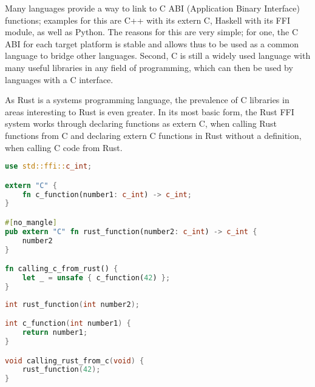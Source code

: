 Many languages provide a way to link to C ABI (Application Binary Interface) functions; examples for this are C++ with its extern C, Haskell with its FFI module, as well as Python.
The reasons for this are very simple; for one, the C ABI for each target platform is stable and allows thus to be used as a common language to bridge other languages.
Second, C is still a widely used language with many useful libraries in any field of programming, which can then be used by languages with a C interface.

As Rust is a systems programming language, the prevalence of C libraries in areas interesting to Rust is even greater.
In its most basic form, the Rust FFI system works through declaring functions as extern C, when calling Rust functions from C
and declaring extern C functions in Rust without a definition, when calling C code from Rust.

\begin{lstlisting}[language=Rust,style=colouredRust]
use std::ffi::c_int;

extern "C" {
    fn c_function(number1: c_int) -> c_int;
}

#[no_mangle]
pub extern "C" fn rust_function(number2: c_int) -> c_int {
    number2
}

fn calling_c_from_rust() {
    let _ = unsafe { c_function(42) };
}
\end{lstlisting}

\begin{lstlisting}[language=C]
int rust_function(int number2);

int c_function(int number1) {
    return number1;
}

void calling_rust_from_c(void) {
    rust_function(42);
}
\end{lstlisting}

